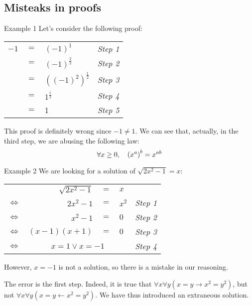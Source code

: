 \documentclass{article}
\begin{document}
\subsection{Misteaks in proofs}
\begin{parag}{Example 1}
    Let's consider the following proof:
    \begin{center}
    \begin{tabular}{r@{\,}c@{\,}l@{\,}|l}
        $-1$ & $=$ & $\left(-1\right)^1$ & \textit{Step 1}  \\
             & $=$ & $\left(-1\right)^{\frac{2}{2}}$ & \textit{Step 2} \\
             & $=$ & $\left(\left(-1\right)^2\right)^{\frac{1}{2}}$ & \textit{Step 3} \\
             & $=$ & $1^{\frac{1}{2}}$ & \textit{Step 4} \\
             & $=$ & 1 & \textit{Step 5}
    \end{tabular}
    \end{center}
    
    This proof is definitely wrong since $-1 \neq 1$. We can see that, actually, in the third step, we are abusing the following law:
    \[\forall x \geq 0, \mathspace \left(x^a\right)^b = x^{ab} \]
\end{parag}

\begin{parag}{Example 2}
    We are looking for a solution of $\sqrt{2x^2 - 1} = x$:
    \begin{center}
    \begin{tabular}{r@{\,}r@{\,}c@{\,}l@{\,}|l}
        & $\sqrt{2x^2 - 1}$ & $=$ & $x$ & \\
        $\iff$ & $2x^2 - 1$ & $=$ & $x^2$ & \textit{Step 1} \\
        $\iff$ & $x^2 - 1$ & $=$ & $0$ & \textit{Step 2}  \\
        $\iff$ & $\left(x - 1\right)\left(x + 1\right)$ & $=$ & $0$ & \textit{Step 3}  \\
        $\iff$ & \multicolumn{3}{c|}{$x = 1 \lor x = -1$} & \textit{Step 4} \\
    \end{tabular}
    \end{center}

    However, $x = -1$ is not a solution, so there is a mistake in our reasoning.

    The error is the first step. Indeed, it is true that $\forall x \forall y\left(x = y \to x^2 = y^2\right)$, but not $\forall x \forall y \left(x = y \leftarrow x^2 = y^2\right)$. We have thus introduced an extraneous solution.
\end{parag}
\end{document}
